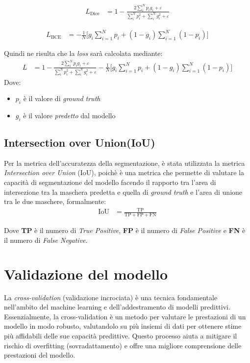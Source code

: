 \begin{align}
	L_{\text{Dice}} & = 1 - \frac{2\sum_i^N p_i g_i + \varepsilon}{\sum_i^N p_i^2 + \sum_i^N g_i^2 + \varepsilon}
	\label{eq:dice_loss}
\end{align}

\begin{align}
	L_{\text{BCE}} & = -\frac{1}{N} \Bigg[ g_i \sum_{i=1}^N p_i + ( 1 - g_i ) \sum_{i=1}^N (1-p_i) \Bigg]
	\label{eq:bce_loss}
\end{align}

Quindi ne risulta che la \textit{loss} sarà calcolata mediante:
\begin{align}
	L & = 1 - \frac{2\sum_i^N p_i g_i + \varepsilon}{\sum_i^N p_i^2 + \sum_i^N g_i^2 + \varepsilon} -\frac{1}{N} \Bigg[ g_i \sum_{i=1}^N p_i + ( 1 - g_i ) \sum_{i=1}^N (1-p_i) \Bigg]
	\label{eq:dice_bce_loss_complete}
\end{align}
Dove:
\begin{itemize}
	\item $p_i$ è il valore di \textit{ground truth}
	\item $g_i$ è il valore \textit{predetto} dal modello
\end{itemize}

\subsection{Intersection over Union(IoU)}
Per la metrica dell'accuratezza della segmentazione, è stata utilizzata la metrica \textit{Intersection over Union} (IoU),
poichè è una metrica che permette di valutare la capacità di segmentazione del modello
facendo il rapporto tra l'area di intersezione tra la maschera predetta e quella di \textit{ground truth} e l'area di unione tra le due maschere, formalmente:
\begin{align}
	\text{IoU} & = \frac{\text{TP}}{\text{TP} + \text{FP} + \text{FN}}
	\label{eq:iou}
\end{align}

Dove \textbf{TP} è il numero di \textit{True Positive}, \textbf{FP} è il numero di \textit{False Positive} e \textbf{FN} è il numero di \textit{False Negative}.

\section{Validazione del modello}

La \textit{cross-validation} (validazione incrociata) è una tecnica fondamentale nell'ambito del machine learning e dell'addestramento di modelli predittivi. Essenzialmente, la cross-validation è un metodo per valutare le prestazioni di un modello in modo robusto, valutandolo su più insiemi di dati per ottenere stime più affidabili delle sue capacità predittive. Questo processo aiuta a mitigare il rischio di overfitting (sovradattamento) e offre una migliore comprensione delle prestazioni del modello.


